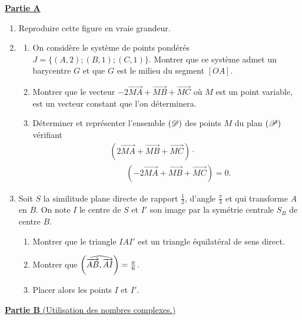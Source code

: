       \textbf{\underline{Partie A}} 
      \begin{enumerate}
            \item Reproduire cette figure en vraie grandeur.
            \item \begin{enumerate}
                        \item On consid\`ere le syst\`eme de points pond\'er\'es 
                              $J = \{ (A,2);(B,1);(C,1) \}$.
	                              Montrer que ce syst\`eme admet un barycentre $G$ et que $G$ est le milieu du segment $[OA]$.
                        \item Montrer que le vecteur $-2\overrightarrow{MA} + \overrightarrow{MB} + \overrightarrow{MC}$
                              o\`u $M$ est un point variable, est un vecteur constant que l'on d\'eterminera.
                        \item D\'eterminer et repr\'esenter l'ensemble $(\mathscr{D})$ des points $M$ du plan $(\mathscr{P})$ v\'erifiant
                              \[
                                \begin{aligned}
                                  &\left(2\overrightarrow{MA}+\overrightarrow{MB}+\overrightarrow{MC}\right)
                                  \mathbin{\cdot} \\
                                  &\qquad\left(-2\overrightarrow{MA}+\overrightarrow{MB}+\overrightarrow{MC}\right)=0.
                                \end{aligned}
                              \]
                  \end{enumerate}
            \item Soit $S$ la similitude plane directe de rapport $\frac{1}{2}$, 
                  d'angle $\frac{\pi}{3}$ et qui transforme $A$ en $B$.
                  On note $I$ le centre de $S$ et $I'$ son image par la sym\'etrie centrale $S_B$ de centre $B$.
                  \begin{enumerate}
                        \item Montrer que le triangle $IAI'$ est un triangle \'equilat\'eral de sens direct.
                        \item Montrer que $\left( \widehat{ \overrightarrow{AB} , \overrightarrow{AI} } \right) = \frac{\pi}{6}$.
                        \item Placer alors les points $I$ et $I'$.
                  \end{enumerate}
      \end{enumerate}
      \underline{\textbf{Partie B} (Utilisation des nombres complexes.)} 
